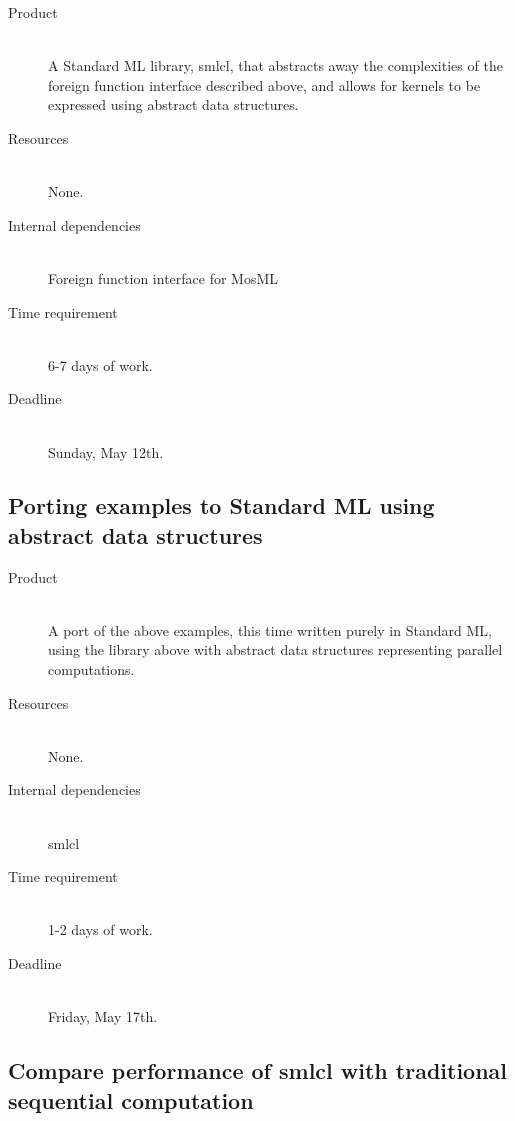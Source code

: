 \documentclass[a4paper, 10pt]{article}
\begin{document}
\begin{description}
  \item[Product] \hfill \\
    A Standard ML library, smlcl, that abstracts away the complexities of the
    foreign function interface described above, and allows for kernels
    to be expressed using abstract data structures.
  \item[Resources] \hfill \\
    None.
  \item[Internal dependencies] \hfill \\
    Foreign function interface for MosML
  \item[Time requirement] \hfill \\
    6-7 days of work.
  \item[Deadline] \hfill \\
    Sunday, May 12th.
\end{description}

\subsection{Porting examples to Standard ML using abstract data structures}

\begin{description}
  \item[Product] \hfill \\ A port of the above examples, this time
    written purely in Standard ML, using the library above with
    abstract data structures representing parallel computations.
  \item[Resources] \hfill \\
    None.
  \item[Internal dependencies] \hfill \\
    smlcl
  \item[Time requirement] \hfill \\
    1-2 days of work.
  \item[Deadline] \hfill \\
    Friday, May 17th.
\end{description}

\subsection{Compare performance of smlcl with traditional sequential
  computation}
\end{document}
